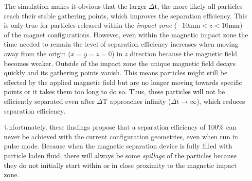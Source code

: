 The simulation makes it obvious that the larger $\Delta\text{t}$, the more likely all particles reach their stable gathering points, which improves the separation efficiency. This is only true for particles released within the \textit{impact zone} ($-10 \text{mm} < z < 10 \text{mm}$) of the magnet configurations. However, even within the magnetic impact zone the time needed to remain the level of separation efficiency increases when moving away from the origin ($x=y=z=0$) in $z$ direction because the magnetic field becomes weaker. Outside of the impact zone the unique magnetic field decays quickly and its gathering points vanish. This means particles might still be effected by the applied magnetic field but are no longer moving towards specific points or it takes them too long to do so. Thus, these particles will not be efficiently separated even after $\Delta \text{T}$ approaches infinity ($\Delta \text{t} \rightarrow \infty$), which reduces separation efficiency.



Unfortunately, these findings propose that a separation efficiency of $100\%$ can never be achieved with the current configuration geometries, even when run in pulse mode. Because when the magnetic separation device is fully filled with particle laden fluid, there will always be some \textit{spillage} of the particles because they do not initially start within or in close proximity to the magnetic impact zone. 

